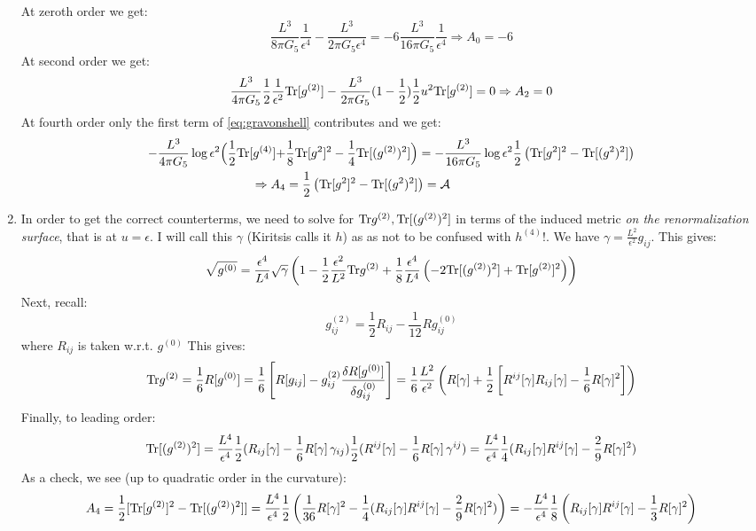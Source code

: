 \documentclass[11pt, class=article, crop=false]{standalone}
\begin{document}
\begin{enumerate}
	At zeroth order we get:
	\[
		\frac{L^3}{8 \pi G_5} \frac{1}{\epsilon^4} - \frac{L^3}{2 \pi G_5 \epsilon^4} = -6 \frac{L^3}{16 \pi G_5} \frac{1}{\epsilon^4} \Rightarrow A_0 = -6
	\]
	At second order we get:
	\[
		\frac{L^3}{4 \pi G_5} \frac12  \frac{1}{\epsilon^2} \mathrm{Tr}[ g^{(2)}] - \frac{L^3}{2 \pi G_5} (1 - \frac12 ) \frac12 u^2 \mathrm{Tr}[g^{(2)}] = 0 \Rightarrow A_2 = 0
	\]
	At fourth order only the first term of \eqref{eq:gravonshell} contributes and we get:
	\[
	\begin{aligned}
		-\frac{L^3}{4 \pi G_5} \log \epsilon^2 \Big( \frac12 \mathrm{Tr}[g^{(4)}] + & \frac18 \mathrm{Tr}[g^{2}]^2 - \frac14 \mathrm{Tr}[(g^{(2)})^2] \Big) = - \frac{L^3}{16 \pi G_5} \log \epsilon^2 \frac12 \left(\mathrm{Tr}[g^{2}]^2  - \mathrm{Tr}[(g^{2})^2]\right)\\
		 \Rightarrow A_4 &= \frac12 \left(\mathrm{Tr}[g^{2}]^2  - \mathrm{Tr}[(g^{2})^2]\right) = \mathcal A
	\end{aligned}
	\]
	\item 
	In order to get the correct counterterms, we need to solve for $\mathrm{Tr} g^{(2)}, \mathrm{Tr} [(g^{(2)})^2]$ in terms of the induced metric \emph{on the renormalization surface}, that is at $u = \epsilon$. I will call this $\gamma$  (Kiritsis calls it $h$) as as not to be confused with $h^{(4)}!$. We have $\gamma = \frac{L^2}{\epsilon^2} g_{ij}$. This gives:
	\[
		\sqrt{g^{(0)}} = \frac{\epsilon^4}{L^4} \sqrt{\gamma} \left(1 - \frac12 \frac{\epsilon^2}{L^2} \mathrm{Tr} g^{(2)} + \frac18 \frac{\epsilon^4}{L^4} \left(-2 \mathrm{Tr} [(g^{(2)})^2]  + \mathrm{Tr}[ g^{(2)}]^2 \right) \right)
	\]
	Next, recall:
	\[
		g^{(2)}_{ij} = \frac12 R_{ij} - \frac{1}{12} R g_{ij}^{(0)}
	\]
	where $R_{ij}$ is taken w.r.t. $g^{(0)}$
	This gives:
	\[
		\mathrm{Tr} g^{(2)} = \frac{1}{6} R[g^{(0)}] = \frac{1}{6} \left[R[g_{ij}] - g^{(2)}_{ij} \frac{\delta R[g^{(0)}]}{\delta g^{(0)}_{ij}}  \right] = \frac16 \frac{L^2}{\epsilon^2} \left(R[\gamma] + \frac{1}{2}\left[R^{ij}[\gamma] R_{ij}[\gamma] - \frac{1}{6} R[\gamma]^2 \right] \right)
	\]
	Finally, to leading order:
	\[
		\mathrm{Tr}[ (g^{(2)})^2] = \frac{L^4}{\epsilon^4} \frac12 (R_{ij}[\gamma] - \frac{1}{6} R[\gamma]\, \gamma_{ij}) \frac12 (R^{ij}[\gamma] - \frac{1}{6} R[\gamma]\, \gamma^{ij}) = \frac{L^4}{\epsilon^4} \frac14 ( R_{ij}[\gamma] R^{ij}[\gamma] - \frac{2}{9} R[\gamma]^2)
	\]
	As a check, we see (up to quadratic order in the curvature):
	\[
		A_4 = \frac12 [\mathrm{Tr}[g^{(2)}]^2 - \mathrm{Tr}[(g^{(2)})^2]] = \frac{L^4}{\epsilon^4} \frac12 \left( \frac{1}{36} R[\gamma]^2 - \frac14 ( R_{ij}[\gamma] R^{ij}[\gamma] - \frac{2}{9} R[\gamma]^2) \right) = -\frac{L^4}{\epsilon^4 }\frac{1}{8}\left(R_{ij}[\gamma] R^{ij}[\gamma] - \frac13 R[\gamma]^2 \right)
	\]
	

\end{enumerate}
\end{document}
